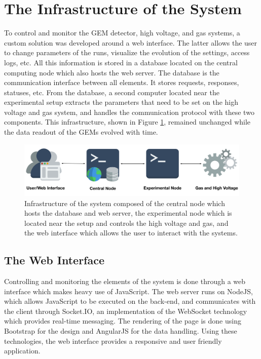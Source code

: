   \section{The Infrastructure of the System}

    To control and monitor the GEM detector, high voltage, and gas systems, a custom solution was developed around a web interface. The latter allows the user to change parameters of the runs, visualize the evolution of the settings, access logs, etc. All this information is stored in a database located on the central computing node which also hosts the web server. The database is the communication interface between all elements. It stores requests, responses, statuses, etc. From the database, a second computer located near the experimental setup extracts the parameters that need to be set on the high voltage and gas system, and handles the communication protocol with these two components. This infrastructure, shown in Figure \ref{fig:III-1-sys-infra}, remained unchanged while the data readout of the GEMs evolved with time.

    \begin{figure}[t!]
      \centering
      \includegraphics[width=\textwidth]{img/III-1-arch/sys.png}
      \caption{Infrastructure of the system composed of the central node which hosts the database and web server, the experimental node which is located near the setup and controls the high voltage and gas, and the web interface which allows the user to interact with the systems.}
      \label{fig:III-1-sys-infra}
    \end{figure}

    \subsection{The Web Interface}

      Controlling and monitoring the elements of the system is done through a web interface which makes heavy use of JavaScript. The web server runs on NodeJS, which allows JavaScript to be executed on the back-end, and communicates with the client through Socket.IO, an implementation of the WebSocket technology which provides real-time messaging. The rendering of the page is done using Bootstrap for the design and AngularJS for the data handling. Using these technologies, the web interface provides a responsive and user friendly application. \\

